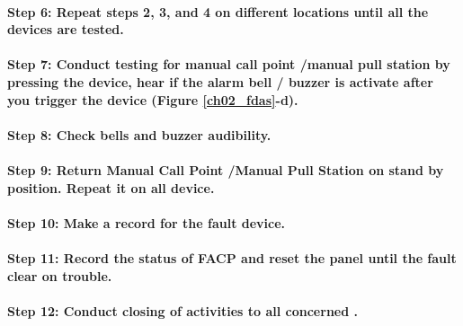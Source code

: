 \paragraph{Step 6: Repeat steps 2, 3, and 4 on different locations until all the devices are tested.}

\paragraph{Step 7: Conduct testing for manual call point /manual pull station by pressing the device, hear if the alarm bell / buzzer is activate after you trigger the device (Figure \ref{ch02_fdas}-d).}

\paragraph{Step 8: Check bells and buzzer audibility.}

\paragraph{Step 9: Return Manual Call Point /Manual Pull Station on stand by position. Repeat it on all device.}

\paragraph{Step 10: Make a record for the fault device.}

\paragraph{Step 11: Record the status of FACP and reset the panel until the fault clear on trouble.}

\paragraph{Step 12: Conduct closing of activities to all concerned .}

